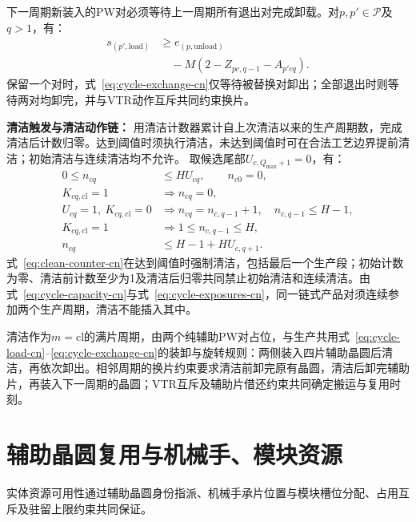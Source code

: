 下一周期新装入的PW对必须等待上一周期所有退出对完成卸载。对$p,p'\in\mathcal P$及$q>1$，有：
\begin{equation}
\begin{aligned}
s_{(p',\mathrm{load})}&\ge e_{(p,\mathrm{unload})}\\
&\quad-M(2-Z_{pc,q-1}-A_{p'cq}).
\end{aligned}
\label{eq:cycle-exchange-cn}
\end{equation}
保留一个对时，式~\eqref{eq:cycle-exchange-cn}仅等待被替换对卸出；全部退出时则等待两对均卸完，并与VTR动作互斥共同约束换片。

\noindent\textbf{清洁触发与清洁动作链：}
用清洁计数器累计自上次清洁以来的生产周期数，完成清洁后计数归零。达到阈值时须执行清洁，未达到阈值时可在合法工艺边界提前清洁；初始清洁与连续清洁均不允许。
取候选尾部$U_{c,Q_{\max}+1}=0$，有：
\begin{equation}
\begin{aligned}
0\le n_{cq}&\le H U_{cq},\qquad n_{c0}=0,\\
K_{cq,\mathrm{cl}}=1&\Rightarrow n_{cq}=0,\\
U_{cq}=1,\ K_{cq,\mathrm{cl}}=0
&\Rightarrow n_{cq}=n_{c,q-1}+1,\quad n_{c,q-1}\le H-1,\\
K_{cq,\mathrm{cl}}=1&\Rightarrow 1\le n_{c,q-1}\le H,\\
n_{cq}&\le H-1+H U_{c,q+1}.
\end{aligned}
\label{eq:clean-counter-cn}
\end{equation}
式~\eqref{eq:clean-counter-cn}在达到阈值时强制清洁，包括最后一个生产段；初始计数为零、清洁前计数至少为1及清洁后归零共同禁止初始清洁和连续清洁。由式~\eqref{eq:cycle-capacity-cn}与式~\eqref{eq:cycle-exposures-cn}，同一链式产品对须连续参加两个生产周期，清洁不能插入其中。

清洁作为$m=\mathrm{cl}$的满片周期，由两个纯辅助PW对占位，与生产共用式~\eqref{eq:cycle-load-cn}--\eqref{eq:cycle-exchange-cn}的装卸与旋转规则：两侧装入四片辅助晶圆后清洁，再依次卸出。相邻周期的换片约束要求清洁前卸完原有晶圆，清洁后卸完辅助片，再装入下一周期的晶圆；VTR互斥及辅助片借还约束共同确定搬运与复用时刻。

\section{辅助晶圆复用与机械手、模块资源}
\label{sec:model-resource-cn}

实体资源可用性通过辅助晶圆身份指派、机械手承片位置与模块槽位分配、占用互斥及驻留上限约束共同保证。

